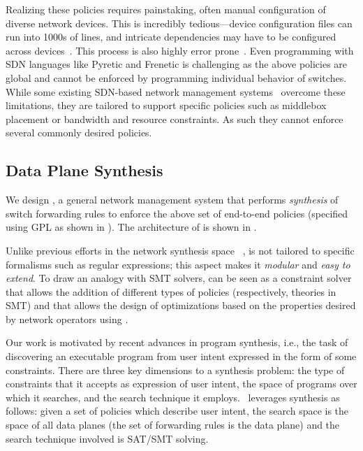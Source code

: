 \noindent Realizing these policies requires painstaking, often
manual configuration of diverse network devices. This is incredibly
tedious---device configuration files can run into 1000s of lines, and
intricate dependencies may have to be configured across
devices~\cite{benson:complexity:nsdi2009,mpa-imc15}. This process is
also highly error prone~\cite{mpa-imc15}. Even programming with SDN
languages like Pyretic and Frenetic is challenging as the above policies
are global and cannot be enforced by programming individual behavior
of switches.  While some existing SDN-based network management
systems~\cite{simple,merlin,oneswitch} overcome these limitations,
they are tailored to support specific policies such as middlebox
placement or bandwidth and resource constraints. As such they cannot
enforce several commonly desired policies.


\subsection{Data Plane Synthesis} \label{sec:synthesis} 


We design \name, a general network management system that 
 performs {\em synthesis} of switch forwarding
rules to enforce the above set of end-to-end policies (specified using 
GPL as shown in ). The architecture of \name
is shown in . 

Unlike previous efforts in the network synthesis space ~\cite{netgen,merlin}, \Name is
not tailored to specific formalisms such as regular expressions; 
this aspect makes it {\em modular} and {\em easy to extend}.
To draw an analogy with SMT solvers, \Name can be seen as a constraint
solver that allows the addition of different types of policies
(respectively, theories in SMT) and that allows the design of
optimizations based on the properties desired by network
  operators using \Name. 
  
  Our work is motivated by recent advances in program synthesis, i.e.,
  the task of discovering an executable program from user intent
  expressed in the form of some constraints. There are three key
  dimensions to a synthesis problem: the type of constraints that it accepts as
  expression of user intent, the space of programs over which it
  searches, and the search technique it employs. 
\Name\ leverages synthesis as follows: given a set of
policies which describe user intent, the search space is the space of
all data planes (the set of forwarding rules is the data plane) 
and the search technique involved
is SAT/SMT solving. 

